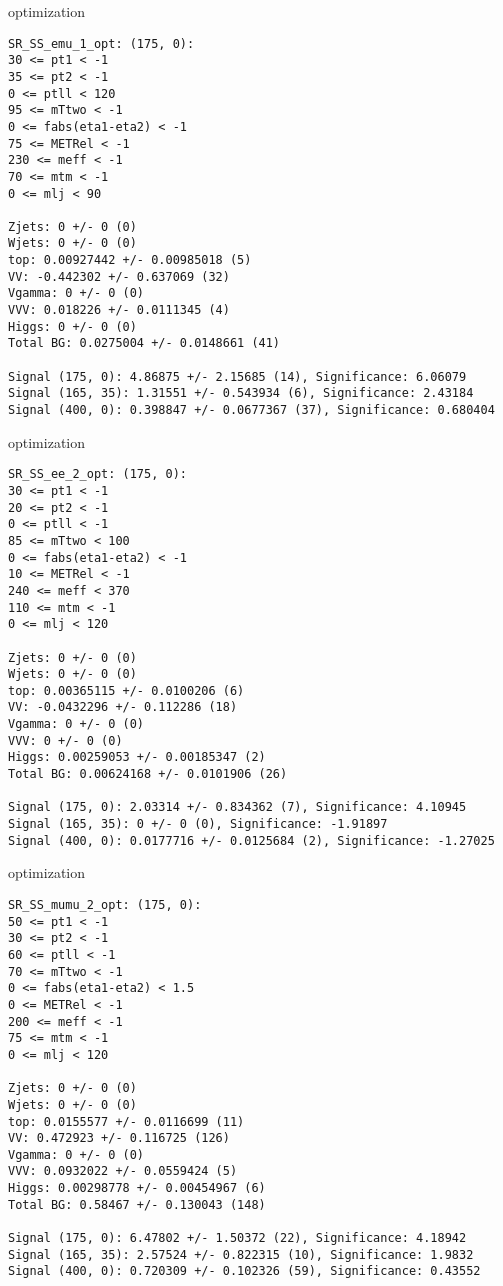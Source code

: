 \begin{frame}[fragile]{optimization}
\tiny
\begin{verbatim}
SR_SS_emu_1_opt: (175, 0):
30 <= pt1 < -1
35 <= pt2 < -1
0 <= ptll < 120
95 <= mTtwo < -1
0 <= fabs(eta1-eta2) < -1
75 <= METRel < -1
230 <= meff < -1
70 <= mtm < -1
0 <= mlj < 90

Zjets: 0 +/- 0 (0)
Wjets: 0 +/- 0 (0)
top: 0.00927442 +/- 0.00985018 (5)
VV: -0.442302 +/- 0.637069 (32)
Vgamma: 0 +/- 0 (0)
VVV: 0.018226 +/- 0.0111345 (4)
Higgs: 0 +/- 0 (0)
Total BG: 0.0275004 +/- 0.0148661 (41)

Signal (175, 0): 4.86875 +/- 2.15685 (14), Significance: 6.06079
Signal (165, 35): 1.31551 +/- 0.543934 (6), Significance: 2.43184
Signal (400, 0): 0.398847 +/- 0.0677367 (37), Significance: 0.680404
\end{verbatim}
\end{frame}

\begin{frame}[fragile]{optimization}
\tiny
\begin{verbatim}
SR_SS_ee_2_opt: (175, 0):
30 <= pt1 < -1
20 <= pt2 < -1
0 <= ptll < -1
85 <= mTtwo < 100
0 <= fabs(eta1-eta2) < -1
10 <= METRel < -1
240 <= meff < 370
110 <= mtm < -1
0 <= mlj < 120

Zjets: 0 +/- 0 (0)
Wjets: 0 +/- 0 (0)
top: 0.00365115 +/- 0.0100206 (6)
VV: -0.0432296 +/- 0.112286 (18)
Vgamma: 0 +/- 0 (0)
VVV: 0 +/- 0 (0)
Higgs: 0.00259053 +/- 0.00185347 (2)
Total BG: 0.00624168 +/- 0.0101906 (26)

Signal (175, 0): 2.03314 +/- 0.834362 (7), Significance: 4.10945
Signal (165, 35): 0 +/- 0 (0), Significance: -1.91897
Signal (400, 0): 0.0177716 +/- 0.0125684 (2), Significance: -1.27025
\end{verbatim}
\end{frame}

\begin{frame}[fragile]{optimization}
\tiny
\begin{verbatim}
SR_SS_mumu_2_opt: (175, 0):
50 <= pt1 < -1
30 <= pt2 < -1
60 <= ptll < -1
70 <= mTtwo < -1
0 <= fabs(eta1-eta2) < 1.5
0 <= METRel < -1
200 <= meff < -1
75 <= mtm < -1
0 <= mlj < 120

Zjets: 0 +/- 0 (0)
Wjets: 0 +/- 0 (0)
top: 0.0155577 +/- 0.0116699 (11)
VV: 0.472923 +/- 0.116725 (126)
Vgamma: 0 +/- 0 (0)
VVV: 0.0932022 +/- 0.0559424 (5)
Higgs: 0.00298778 +/- 0.00454967 (6)
Total BG: 0.58467 +/- 0.130043 (148)

Signal (175, 0): 6.47802 +/- 1.50372 (22), Significance: 4.18942
Signal (165, 35): 2.57524 +/- 0.822315 (10), Significance: 1.9832
Signal (400, 0): 0.720309 +/- 0.102326 (59), Significance: 0.43552
\end{verbatim}
\end{frame}

